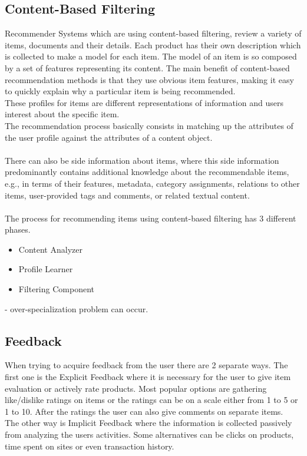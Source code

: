 \documentclass[10pt,oneside,english,a4paper]{article}
\begin{document}
\subsection{Content-Based Filtering}
Recommender Systems which are using content-based filtering, review a variety of items, documents and their details. Each product has their own description which is collected to make a model for each item. The model of an item is so composed by a set of features representing its content. The main benefit of content-based recommendation methods is that they use obvious item features, making it easy to quickly explain why a particular item is being recommended. \cite{pub.1034486657}\\
These profiles for items are different representations of information and users interest about the specific item. \\
The recommendation process basically consists in matching
up the attributes of the user profile against the attributes of a content object.
\cite{pub.1034486657}\\\\
There can also be side information about items, where this side information predominantly contains additional knowledge about the recommendable items, e.g., in terms of their features, metadata, category assignments, relations to other items, user-provided tags and comments, or related textual content. \cite{Lops2019239}\\\\
The process for recommending items using content-based filtering has 3 different phases.
\begin{itemize}
\item Content Analyzer
\item Profile Learner
\item Filtering Component
\end{itemize}
- over-specialization problem can occur.\\


\subsection{Feedback}
When trying to acquire feedback from the user there are 2 separate ways. The first one is the Explicit Feedback where it is necessary for the user to give item evaluation or actively rate products. Most popular options are gathering like/dislike ratings on items or the ratings can be on a scale either from 1 to 5 or 1 to 10. After the ratings the user can also give comments on separate items. \\
The other way is Implicit Feedback where the information is collected passively from analyzing the users activities. Some alternatives can be clicks on products, time spent on sites or even transaction history.\\
\end{document}

